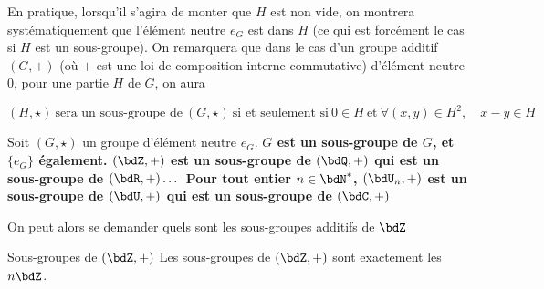 \documentclass[a4paper,french,bookmarks]{article}
\begin{document}
En pratique, lorsqu'il s'agira de monter que $H$ est non vide, on montrera systématiquement que l'élément neutre $e_G$ est dans $H$ (ce qui est forcément le cas si $H$ est un sous-groupe). On remarquera que dans le cas d'un groupe additif $(G, +)$ (où $+$ est une loi de composition interne commutative) d'élément neutre $0$, pour une partie $H$ de $G$, on aura 

\[(H, \star) \ \text{sera un sous-groupe de} \ (G, \star) \ \text{si et seulement si} \ 0 \in H \ \text{et} \ \forall (x, y) \in H^2,\quad x-y \in H\]

\begin{example}{}{}
    \begin{enumerate}
        \ithand Soit $(G, \star)$ un groupe d'élément neutre $e_G$. \bf{$G$ est un sous-groupe de $G$}, et \bf{$\{e_G\}$ également}.
        \ithand \bf{$(\bdZ, +)$ est un sous-groupe de $(\bdQ, +)$ qui est un sous-groupe de $(\bdR, +) \dots$}
        \ithand Pour tout entier $n \in \bdN^*$, \bf{$(\bdU_n, +)$ est un sous-groupe de $(\bdU, +)$ qui est un sous-groupe de $(\bdC, +)$}
    \end{enumerate}
\end{example}

On peut alors se demander quels sont les sous-groupes additifs de $\bdZ$

\begin{theorem}{Sous-groupes de $(\bdZ, +)$}{}
    Les sous-groupes de $(\bdZ, +)$ sont exactement les $n\bdZ$.
\end{theorem}
\end{document}
